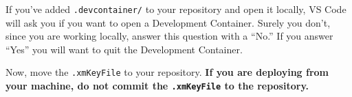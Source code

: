 \documentclass{ximera}
\begin{document}
\begin{warning}
    If you've added \verb!.devcontainer/! to your repository and open it
    locally, VS Code will ask you if you want to open a Development Container.
    Surely you don't, since you are working locally, answer this question with a
    ``No.'' If you answer ``Yes'' you will want to quit the Development Container.
\end{warning}

Now, move the \verb!.xmKeyFile! to your repository.
\textbf{If you are deploying from your machine, do not commit the
    \texttt{.xmKeyFile} to the repository.}
\end{document}
